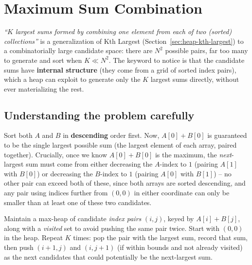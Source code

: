 \section{Maximum Sum Combination}
\label{sec:heap-max-sum-combination}


\begin{patternbox}
\emph{``$K$ largest sums formed by combining one element from each of two
(sorted) collections''} is a generalization of Kth Largest
(Section~\ref{sec:heap-kth-largest}) to a combinatorially large candidate
space: there are $N^2$ possible pairs, far too many to generate and sort
when $K \ll N^2$. The keyword to notice is that the candidate sums have
\textbf{internal structure} (they come from a grid of sorted index pairs),
which a heap can exploit to generate only the $K$ largest sums directly,
without ever materializing the rest.
\end{patternbox}

\subsection*{Understanding the problem carefully}

Sort both $A$ and $B$ in \textbf{descending} order first. Now,
$A[0]+B[0]$ is guaranteed to be the single largest possible sum (the
largest element of each array, paired together). Crucially, once we know
$A[0]+B[0]$ is the maximum, the \emph{next}-largest sum must come from
either decreasing the $A$-index to $1$ (pairing $A[1]$ with $B[0]$) or
decreasing the $B$-index to $1$ (pairing $A[0]$ with $B[1]$) -- no other
pair can exceed both of these, since both arrays are sorted descending,
and any pair using indices further from $(0,0)$ in either coordinate can
only be smaller than at least one of these two candidates.

\begin{ideabox}
Maintain a max-heap of candidate \emph{index pairs} $(i,j)$, keyed by
$A[i]+B[j]$, along with a \textit{visited} set to avoid pushing the same
pair twice. Start with $(0,0)$ in the heap. Repeat $K$ times: pop the pair
with the largest sum, record that sum, then push $(i+1,j)$ and $(i,j+1)$
(if within bounds and not already visited) as the next candidates that
could potentially be the next-largest sum.
\end{ideabox}


